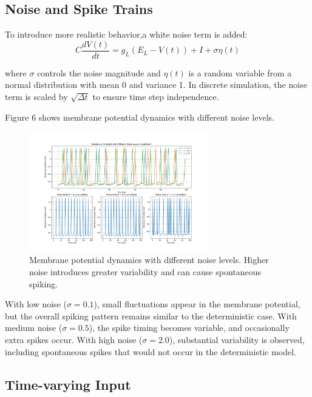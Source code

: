 \documentclass[11pt,a4paper]{article}
\begin{document}
\subsection{Noise and Spike Trains}

To introduce more realistic behavior,a white noise term is added:
\begin{equation}
C \frac{dV(t)}{dt} = g_L(E_L - V(t)) + I + \sigma\eta(t)
\end{equation}

where $\sigma$ controls the noise magnitude and $\eta(t)$ is a random variable from a normal distribution with mean 0 and variance 1. In discrete simulation, the noise term is scaled by $\sqrt{\Delta t}$ to ensure time step independence.

Figure 6 shows membrane potential dynamics with different noise levels.

\begin{figure}[H]
\centering
\includegraphics[width=0.7\textwidth]{fig6.png}
\caption{Membrane potential dynamics with different noise levels. Higher noise introduces greater variability and can cause spontaneous spiking.}
\label{fig:noise_effects}
\end{figure}

With low noise ($\sigma = 0.1$), small fluctuations appear in the membrane potential, but the overall spiking pattern remains similar to the deterministic case. With medium noise ($\sigma = 0.5$), the spike timing becomes variable, and occasionally extra spikes occur. With high noise ($\sigma = 2.0$), substantial variability is observed, including spontaneous spikes that would not occur in the deterministic model.

\subsection{Time-varying Input}
\end{document}
